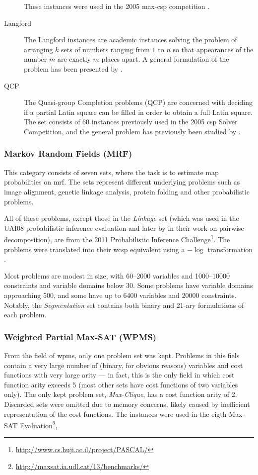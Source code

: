 \begin{description}
		These instances were used in the 2005 max-\gls{csp} competition \parencite{Boussemart05}.
	\item[Langford]
		The Langford instances are academic instances solving the problem of arranging \(k\) sets of numbers ranging from \(1\) to \(n\) so that appearances of the number \(m\) are exactly \(m\) places apart.
		A general formulation of the problem has been presented by \textcite{Linek03}.
	\item[QCP]
		The Quasi-group Completion problems (QCP) are concerned with deciding if a partial Latin square can be filled in order to obtain a full Latin square.
		The set consists of 60 instances previously used in the 2005 \gls{csp} Solver Competition, and the general problem has previously been studied by \textcite{Gomes02}.
\end{description}

\subsubsection{Markov Random Fields (MRF)}
This category consists of seven sets, where the task is to estimate \gls{map} probabilities on \gls{mrf}. The sets represent different underlying problems such as image alignment, genetic linkage analysis, protein folding and other probabilistic problems.

All of these problems, except those in the \emph{Linkage} set (which was used in the UAI08 probabilistic inference evaluation and later by \textcite{Favier11} in their work on pairwise decomposition), are from the 2011 Probabilistic Inference Challenge\footnote{\url{http://www.cs.huji.ac.il/project/PASCAL/}}.
The problems were translated into their \gls{wcsp} equivalent using a \(-\log{}\) transformation \parencite[\pno~4]{deGivry14}.

Most problems are modest in size, with \numrange{60}{2000} variables and \numrange{1000}{10000} constraints and variable domains below \num{30}. 
Some problems have variable domains approaching \num{500}, and some have up to \num{6400} variables and \num{20000} constraints.
Notably, the \emph{Segmentation} set contains both binary and 21-ary formulations of each problem.


\subsubsection{Weighted Partial Max-SAT (WPMS)}
From the field of \gls{wpms}, only one problem set was kept.
Problems in this fiels contain a very large number of (binary, for obvious reasons) variables and cost functions with very large arity --- in fact, this is the only field in which cost function arity exceeds \num{5} (most other sets have cost functions of two variables only).
The only kept problem set, \emph{Max-Clique}, has a cost function arity of \num{2}.
Discarded sets were omitted due to memory concerns, likely caused by inefficient representation of the cost functions.
The instances were used in the eigth Max-SAT Evaluation\footnote{\url{http://maxsat.ia.udl.cat/13/benchmarks/}},


